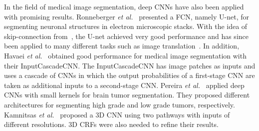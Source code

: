 \documentclass[twocolumn]{svjour3}
\begin{document}
In the field of medical image segmentation, deep CNNs have also been applied with promising results.  Ronneberger \emph{et al.}~\cite{ronneberger2015u} presented a FCN, namely U-net, for segmenting neuronal structures in electron microscopic stacks.  With the idea of skip-connection from~\cite{long2015fully}, the U-net achieved very good performance and has since been applied to many different tasks such as image translation~\cite{isola2016image}.
In addition, Havaei \emph{et al.}~\cite{havaei2017brain} obtained good performance for medical image segmentation with their InputCascadeCNN. The InputCascadeCNN has image patches as inputs and uses a cascade of CNNs in which the output probabilities of a first-stage CNN are taken as additional inputs to a second-stage CNN.
Pereira \emph{et al.}~\cite{pereira2016brain} applied deep CNNs with small kernels for brain tumor segmentation.
They proposed different architectures for segmenting high grade and low grade tumors, respectively.
Kamnitsas \emph{et al.}~\cite{kamnitsas2017efficient} proposed a 3D CNN using two pathways with inputs of different resolutions. 3D CRFs were also needed to refine their results.
\end{document}
